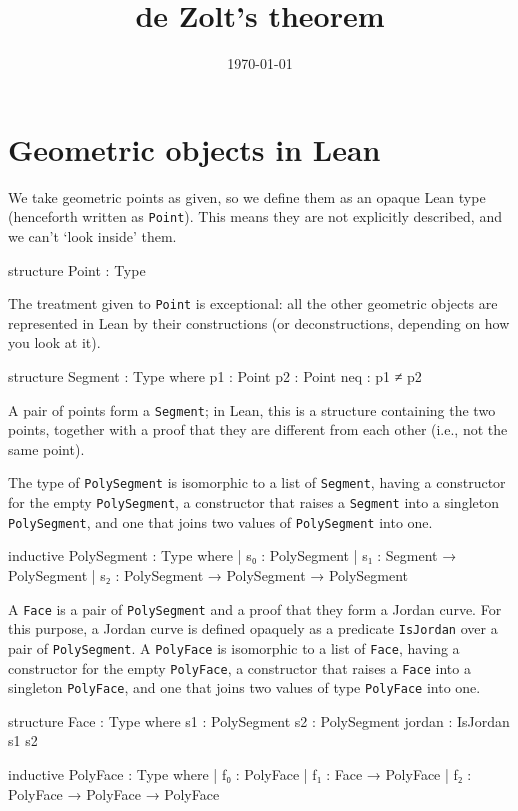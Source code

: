 \documentclass[12pt]{article} %
\date{\today}
\title{de Zolt's theorem}
\newcommand{\leanline}[1]{\texttt{#1}} %
\newcommand{\point}{\texttt{Point}} %
\newcommand{\segment}{\texttt{Segment}} %
\newcommand{\psegment}{\texttt{PolySegment}} %
\newcommand{\face}{\texttt{Face}} %
\newcommand{\pface}{\texttt{PolyFace}} %
\begin{document}
\maketitle %

\section{Geometric objects in Lean}\label{sec:geom-objects-lean} %

We take geometric points as given, so we define them as an opaque Lean type (henceforth written as \point). %
This means they are not explicitly described, and we can't ‘look inside’ them. %

\begin{leancode}
structure Point : Type
\end{leancode}
The treatment given to \point{} is exceptional: all the other geometric objects are represented in Lean by their constructions (or deconstructions, depending on how you look at it). %

\begin{leancode}
structure Segment : Type where
  p1 : Point
  p2 : Point
  neq : p1 ≠ p2
\end{leancode}

A pair of points form a \segment; in Lean, this is a structure
containing the two points, together with a proof that they are
different from each other (i.e., not the same point). %

The type of \psegment{} is isomorphic to a list of \segment, having a constructor for the empty \psegment, a constructor that raises a \segment{} into a singleton \psegment, and one that joins two values of \psegment{} into one. %
\begin{leancode}
inductive PolySegment : Type where
| s₀ : PolySegment
| s₁ : Segment → PolySegment
| s₂ : PolySegment → PolySegment → PolySegment
\end{leancode}

A \face{} is a pair of \psegment{} and a proof that they form a Jordan
curve. %
For this purpose, a Jordan curve is defined opaquely as a predicate \leanline{IsJordan} over a pair of \psegment{}. %
A \pface{} is isomorphic to a list of \face, having a constructor for the empty \pface, a constructor that raises a \face{} into a singleton \pface, and one that joins two values of type \pface{} into one. %
\begin{leancode}
structure Face : Type where
  s1 : PolySegment
  s2 : PolySegment
  jordan : IsJordan s1 s2

inductive PolyFace : Type where
| f₀ : PolyFace
| f₁ : Face → PolyFace
| f₂ : PolyFace → PolyFace → PolyFace
\end{leancode}
\end{document}
